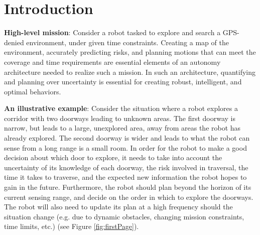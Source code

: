 \documentclass[letterpaper, 10 pt, conference]{ieeeconf}  %
\newcommand{\ph}[1]{{\textbf{#1}:}} %
\begin{document}





\section{Introduction}
\ph{High-level mission} Consider a robot tasked to explore and search a GPS-denied environment, under given time constraints. Creating a map of the environment, accurately predicting risks, and planning motions that can meet the coverage and time requirements are essential elements of an autonomy architecture needed to realize such a mission.  In such an architecture, quantifying and planning over uncertainty is essential for creating robust, intelligent, and optimal behaviors.

\ph{An illustrative example} Consider the situation where a robot explores a corridor with two doorways leading to unknown areas.  The first doorway is narrow, but leads to a large, unexplored area, away from areas the robot has already explored.  The second doorway is wider and leads to what the robot can sense from a long range is a small room.  In order for the robot to make a good decision about which door to explore, it needs to take into account the uncertainty of its knowledge of each doorway, the risk involved in traversal, the time it takes to traverse, and the expected new information the robot hopes to gain in the future.  Furthermore, the robot should plan beyond the horizon of its current sensing range, and decide on the order in which to explore the doorways.  The robot will also need to update its plan at a high frequency should the situation change (e.g. due to dynamic obstacles, changing mission constraints, time limits, etc.) (see Figure \ref{fig:firstPage}).
\end{document}
